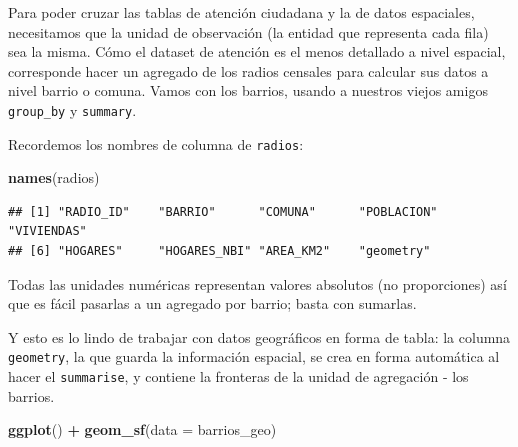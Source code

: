 \documentclass[spanish,]{book}
\newenvironment{Shaded}{\begin{snugshade}}{\end{snugshade}}
\newcommand{\DataTypeTok}[1]{\textcolor[rgb]{0.13,0.29,0.53}{#1}}
\newcommand{\KeywordTok}[1]{\textcolor[rgb]{0.13,0.29,0.53}{\textbf{#1}}}
\newcommand{\NormalTok}[1]{#1}
\newcommand{\OperatorTok}[1]{\textcolor[rgb]{0.81,0.36,0.00}{\textbf{#1}}}
\newcommand{\StringTok}[1]{\textcolor[rgb]{0.31,0.60,0.02}{#1}}
\begin{document}
Para poder cruzar las tablas de atención ciudadana y la de datos espaciales, necesitamos que la unidad de observación (la entidad que representa cada fila) sea la misma. Cómo el dataset de atención es el menos detallado a nivel espacial, corresponde hacer un agregado de los radios censales para calcular sus datos a nivel barrio o comuna. Vamos con los barrios, usando a nuestros viejos amigos \texttt{group\_by} y \texttt{summary}.

Recordemos los nombres de columna de \texttt{radios}:

\begin{Shaded}
\begin{Highlighting}[]
\KeywordTok{names}\NormalTok{(radios)}
\end{Highlighting}
\end{Shaded}

\begin{verbatim}
## [1] "RADIO_ID"    "BARRIO"      "COMUNA"      "POBLACION"   "VIVIENDAS"  
## [6] "HOGARES"     "HOGARES_NBI" "AREA_KM2"    "geometry"
\end{verbatim}

Todas las unidades numéricas representan valores absolutos (no proporciones) así que es fácil pasarlas a un agregado por barrio; basta con sumarlas.

\begin{Shaded}
\end{Shaded}

Y esto es lo lindo de trabajar con datos geográficos en forma de tabla: la columna \texttt{geometry}, la que guarda la información espacial, se crea en forma automática al hacer el \texttt{summarise}, y contiene la fronteras de la unidad de agregación - los barrios.

\begin{Shaded}
\begin{Highlighting}[]
\KeywordTok{ggplot}\NormalTok{() }\OperatorTok{+}\StringTok{ }\KeywordTok{geom_sf}\NormalTok{(}\DataTypeTok{data =}\NormalTok{ barrios_geo)}
\end{Highlighting}
\end{Shaded}
\end{document}
